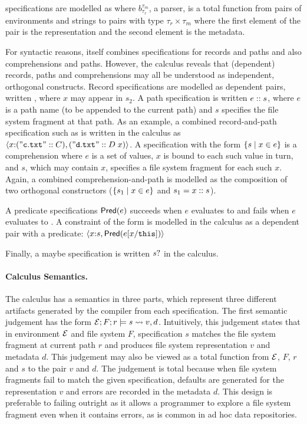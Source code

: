 \padshaskell{} specifications are modelled as
 where $b^{\tau_m}_{\tau_r}$, a parser,  is a total
function from pairs of environments and strings to
pairs with type $\tau_r \times \tau_m$ where the
first element of the pair is the representation and the
second element is the metadata.  

For syntactic reasons, \forest{} itself combines specifications
for records and paths and also comprehensions and paths.
However, the calculus reveals that (dependent) records, paths 
and comprehensions
may all be understood as independent, orthogonal constructs.
Record specifications are modelled as dependent pairs,
written , where $x$ may appear in $s_2$.
A path specification is written $e \mathrel{::} s$, where $e$ is
a path name (to be appended to the current path) and 
$s$ specifies the file system fragment at that path.  As an example,
a combined \forest{} record-and-path specification such as
is written in the calculus as
$\langle x {:} (\mathtt{"c.txt"} \mathrel{::} C), (\mathtt{"d.txt"} \mathrel{::} D\; x) \rangle$.
A specification with the form $\{ s \mid x \in e \}$ is a comprehension where
$e$ is a set of values, $x$ is bound to each such value in turn, and
$s$, which may contain $x$, specifies a file system fragment for each
such $x$.  Again, a combined \forest{} comprehension-and-path
\cd{[x :: s | x <- e]} is modelled as the composition of two
orthogonal constructors ($\{ s_1 \mid x \in e \}$ and $s_1 = x \mathrel{::} s$).

A predicate specifications $\mathsf{Pred}(e)$ succeeds
when $e$ evaluates to \True{} and fails when $e$ evaluates
to \False.  A \forest{} constraint of the form 
is modelled in the calculus as a dependent pair with a predicate:
$\langle x {:} s, \mathsf{Pred}(e[x/\mathtt{this}]) \rangle$

Finally, a maybe specification is written $s?$ in the calculus.

\paragraph*{Calculus Semantics.}
The calculus has a semantics in three parts, which represent three different
artifacts generated by the \forest{} compiler from each specification.  The
first semantic judgement has the form $\mathcal{E};F;r \models s \rightsquigarrow v,d$.
Intuitively, this judgement states that in environment $\mathcal{E}$ and file system
$F$, specification $s$ matches the file system fragment at current path $r$
and produces file system representation $v$ and metadata $d$.  This judgement
may also be viewed as a total function from $\mathcal{E}$, $F$, $r$ and $s$ to the
pair $v$ and $d$.  The judgement is total because when file system fragments
fail to match the given specification, defaults are generated for the representation
$v$ and errors are recorded in the metadata $d$.  This design is preferable to
failing outright as it allows a programmer
to explore a file system fragment even when it contains errors, as is common
in ad hoc data repositories.  

